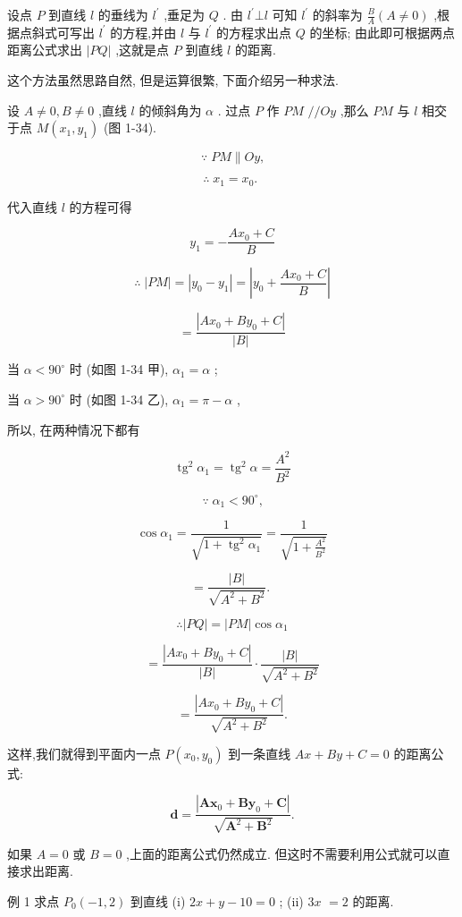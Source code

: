 \documentclass[lang=cn,newtx,10.5pt,scheme=chinese]{elegantbook}
\begin{document}
设点 \(P\) 到直线 \(l\) 的垂线为 \({l}^{\prime }\) ,垂足为 \(Q\) . 由 \({l}^{\prime } \bot l\) 可知 \({l}^{\prime }\) 的斜率为 \(\frac{B}{A}\left( {A \neq 0}\right)\) ,根据点斜式可写出 \({l}^{\prime }\) 的方程,并由 \(l\) 与 \({l}^{\prime }\) 的方程求出点 \(Q\) 的坐标; 由此即可根据两点距离公式求出 \(\left| {PQ}\right|\) ,这就是点 \(P\) 到直线 \(l\) 的距离.

这个方法虽然思路自然, 但是运算很繁, 下面介绍另一种求法.

设 \(A \neq 0,B \neq 0\) ,直线 \(l\) 的倾斜角为 \(\alpha\) . 过点 \(P\) 作 \({PM}\) \(//{Oy}\) ,那么 \({PM}\) 与 \(l\) 相交于点 \(M\left( {{x}_{1},{y}_{1}}\right)\) (图 1-34).

\[
  \because \;{PM}\parallel {Oy}\text{,}
\]

\[
  \therefore \;{x}_{1} = {x}_{0}\text{. }
\]

代入直线 \(l\) 的方程可得

\[
    {y}_{1} = - \frac{A{x}_{0} + C}{B}
\]

\[
  \therefore \;\left| {PM}\right| = \left| {{y}_{0} - {y}_{1}}\right| = \left| {{y}_{0} + \frac{A{x}_{0} + C}{B}}\right|
\]

\[
  = \frac{\left| A{x}_{0} + B{y}_{0} + C\right| }{\left| B\right| }
\]

当 \(\alpha < {90}^{ \circ }\) 时 (如图 1-34 甲), \({\alpha }_{1} = \alpha\) ;

当 \(\alpha > {90}^{ \circ }\) 时 (如图 1-34 乙), \({\alpha }_{1} = \pi - \alpha\) ,

所以, 在两种情况下都有

\[
    {\operatorname{tg}}^{2}{\alpha }_{1} = {\operatorname{tg}}^{2}\alpha = \frac{{A}^{2}}{{B}^{2}}
\]

\[
  \because \;{\alpha }_{1} < {90}^{ \circ }\text{,}
\]

\[
  \cos {\alpha }_{1} = \frac{1}{\sqrt{1 + {\operatorname{tg}}^{2}{\alpha }_{1}}} = \frac{1}{\sqrt{1 + \frac{{A}^{2}}{{B}^{2}}}}
\]

\[
  = \frac{\left| B\right| }{\sqrt{{A}^{2} + {B}^{2}}}\text{. }
\]

\[
  \therefore \left| {PQ}\right| = \left| {PM}\right| \cos {\alpha }_{1}
\]

\[
  = \frac{\left| A{x}_{0} + B{y}_{0} + C\right| }{\left| B\right| } \cdot \frac{\left| B\right| }{\sqrt{{A}^{2} + {B}^{2}}}
\]

\[
  = \frac{\left| A{x}_{0} + B{y}_{0} + C\right| }{\sqrt{{A}^{2} + {B}^{2}}}.
\]
\begin{corollary}[点到直线的距离公式]
这样,我们就得到平面内一点 \(P\left( {{x}_{0},{y}_{0}}\right)\) 到一条直线 \({Ax} + {By} + C = 0\) 的距离公式:

\[
  \mathbf{d} = \frac{\left| \mathbf{A}{\mathbf{x}}_{0} + \mathbf{B}{\mathbf{y}}_{0} + \mathbf{C}\right| }{\sqrt{{\mathbf{A}}^{2} + {\mathbf{B}}^{2}}}.
\]

如果 \(A = 0\) 或 \(B = 0\) ,上面的距离公式仍然成立. 但这时不需要利用公式就可以直接求出距离.
\end{corollary}
例 1 求点 \({P}_{0}\left( {-1,2}\right)\) 到直线 (i) \({2x} + y - {10} = 0\) ; (ii) \({3x}\) \(= 2\) 的距离.
\end{document}
